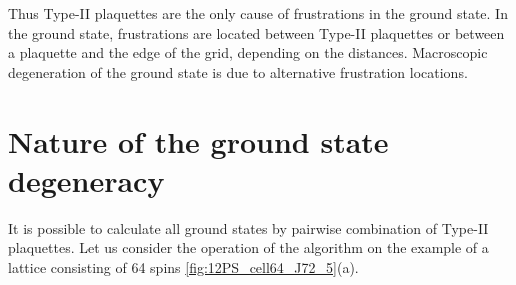 \documentclass[preprint,12pt]{elsarticle}
\begin{document}
Thus Type-II plaquettes are the only cause of frustrations in the ground state. In the ground state, frustrations are located between Type-II plaquettes or between a plaquette and the edge of the grid, depending on the distances. Macroscopic degeneration of the ground state is due to alternative frustration locations.

\section{Nature of the ground state degeneracy}

It is possible to calculate all ground states by pairwise combination of Type-II plaquettes. Let us consider the operation of the algorithm on the example of a lattice consisting of 64 spins \ref{fig:12PS_cell64_J72_5}(a).
\end{document}
